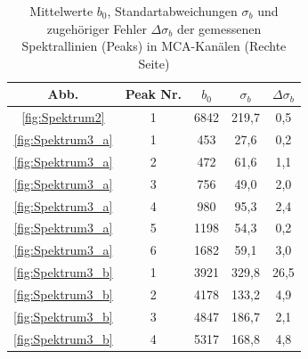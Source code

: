 \begin{table}
    \centering
    \caption{Mittelwerte $b_0$, Standartabweichungen $\sigma_b$ und zugehöriger Fehler $\Delta \sigma_b$ der gemessenen Spektrallinien (Peaks) in MCA-Kanälen (Rechte Seite)}
    \begin{tabular}{|c|c|c|c|c|}
        \hline
         Abb. & Peak Nr. & $b_0$ & $\sigma_b$ & $\Delta \sigma_b$ \\ \hline \hline
         \ref{fig:Spektrum2} & 1 & 6842 & 219,7 & 0,5 \\ \hline
         \ref{fig:Spektrum3_a} & 1 & 453 & 27,6 & 0,2 \\ \hline
         \ref{fig:Spektrum3_a} & 2 & 472 & 61,6 & 1,1 \\ \hline
         \ref{fig:Spektrum3_a} & 3 & 756 & 49,0 & 2,0 \\ \hline
         \ref{fig:Spektrum3_a} & 4 & 980 & 95,3 & 2,4 \\ \hline
         \ref{fig:Spektrum3_a} & 5 & 1198 & 54,3 & 0,2 \\ \hline
         \ref{fig:Spektrum3_a} & 6 & 1682 & 59,1 & 3,0 \\ \hline
         \ref{fig:Spektrum3_b} & 1 & 3921 & 329,8 & 26,5 \\ \hline
         \ref{fig:Spektrum3_b} & 2 & 4178 & 133,2 & 4,9 \\ \hline
         \ref{fig:Spektrum3_b} & 3 & 4847 & 186,7 & 2,1 \\ \hline
         \ref{fig:Spektrum3_b} & 4 & 5317 & 168,8 & 4,8 \\ \hline
    \end{tabular}
    \label{tab:PeakWerte1}
\end{table}


